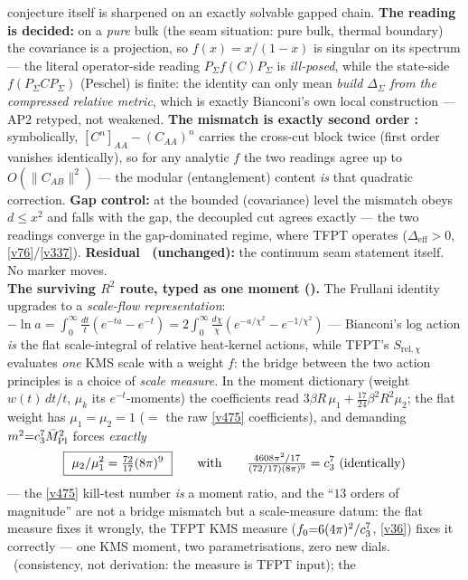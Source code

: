 \begin{keybox}
conjecture itself is sharpened on an exactly solvable gapped chain. \textbf{The reading is decided:}
on a \emph{pure} bulk (the seam situation: pure bulk, thermal boundary) the covariance is a projection,
so $f(x){=}x/(1{-}x)$ is singular on its spectrum --- the literal operator-side reading
$P_\Sigma f(C) P_\Sigma$ is \emph{ill-posed}, while the state-side $f(P_\Sigma C P_\Sigma)$ (Peschel)
is finite: the identity can only mean \emph{build $\Delta_\Sigma$ from the compressed relative metric},
which is exactly Bianconi's own local construction --- AP2 retyped, not weakened. \textbf{The mismatch
is exactly second order \mE:} symbolically, $[C^n]_{AA}-(C_{AA})^n$ carries the cross-cut block twice
(first order vanishes identically), so for any analytic $f$ the two readings agree up to $O(\|C_{AB}\|^2)$
--- the modular (entanglement) content \emph{is} that quadratic correction. \textbf{Gap control:} at the
bounded (covariance) level the mismatch obeys $d\le x^2$ and falls with the gap, the decoupled cut agrees
exactly --- the two readings converge in the gap-dominated regime, where TFPT operates
($\Delta_{\mathrm{eff}}{>}0$, \vref{v76}/\vref{v337}). \textbf{Residual \mO\ (unchanged):} the continuum
seam statement itself. No marker moves.
\smallskip\\
\noindent\textbf{The surviving $R^2$ route, typed as one moment ().}
The Frullani identity upgrades to a \emph{scale-flow representation}: $-\ln a=\int_0^\infty
\tfrac{dt}t(e^{-ta}{-}e^{-t})=2\int_0^\infty\tfrac{d\chi}\chi(e^{-a/\chi^2}{-}e^{-1/\chi^2})$ ---
Bianconi's log action \emph{is} the flat scale-integral of relative heat-kernel actions, while TFPT's
$S_{\mathrm{rel},\chi}$ evaluates \emph{one} KMS scale with a weight $f$: the bridge between the two
action principles is a choice of \emph{scale measure}. In the moment dictionary (weight $w(t)\,dt/t$,
$\mu_k$ its $e^{-t}$-moments) the coefficients read $3\beta R\,\mu_1+\tfrac{17}{24}\beta^2R^2\mu_2$;
the flat weight has $\mu_1{=}\mu_2{=}1$ ($=$ the raw \vref{v475} coefficients), and demanding
$m^2{=}c_3^7\bar M_{\mathrm{Pl}}^2$ forces \emph{exactly}
\[
  \boxed{\ \mu_2/\mu_1^2=\tfrac{72}{17}(8\pi)^9\ }\qquad\text{with}\qquad
  \tfrac{4608\pi^2/17}{(72/17)(8\pi)^9}=\cthree^7\ \text{(identically)}
\]
--- the \vref{v475} kill-test number \emph{is} a moment ratio, and the ``$13$ orders of magnitude''
are not a bridge mismatch but a scale-measure datum: the flat measure fixes it wrongly, the TFPT KMS
measure ($f_0{=}6(4\pi)^2/c_3^7$, \vref{v36}) fixes it correctly --- one KMS moment, two
parametrisations, zero new dials. \mC\ (consistency, not derivation: the measure is TFPT input); the

\end{keybox}
